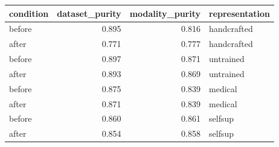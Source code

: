 \begin{tabular}{lrrl}
\toprule
condition & dataset\_purity & modality\_purity & representation \\
\midrule
before & 0.895 & 0.816 & handcrafted \\
after & 0.771 & 0.777 & handcrafted \\
before & 0.897 & 0.871 & untrained \\
after & 0.893 & 0.869 & untrained \\
before & 0.875 & 0.839 & medical \\
after & 0.871 & 0.839 & medical \\
before & 0.860 & 0.861 & selfsup \\
after & 0.854 & 0.858 & selfsup \\
\bottomrule
\end{tabular}
